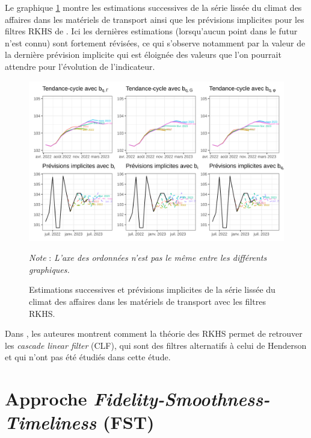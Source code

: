 \documentclass[
  12pt,
  a4paper,french]{article}
\newcommand\1{\mathds{1}}
\begin{document}
Le graphique \ref{fig:graphs-ex-rkhs} montre les estimations successives de la série lissée du climat des affaires dans les matériels de transport ainsi que les prévisions implicites pour les filtres RKHS de \textcite{dagumbianconcini2015new}.
Ici les dernières estimations (lorsqu'aucun point dans le futur n'est connu) sont fortement révisées, ce qui s'observe notamment par la valeur de la dernière prévision implicite qui est éloignée des valeurs que l'on pourrait attendre pour l'évolution de l'indicateur.

\begin{figure}

{\centering \includegraphics[width=1\linewidth]{img/ex/rkhs} 

}

\caption[Estimations successives et prévisions implicites de la série lissée du climat des affaires dans les matériels de transport avec les filtres RKHS]{Estimations successives et prévisions implicites de la série lissée du climat des affaires dans les matériels de transport avec les filtres RKHS.}\label{fig:graphs-ex-rkhs}

\footnotesize


\emph{Note} : \emph{L'axe des ordonnées n'est pas le même entre les différents graphiques.}
\normalsize\end{figure}

Dans \textcite{dagumBianconcini2023}, les auteures montrent comment la théorie des RKHS permet de retrouver les \emph{cascade linear filter} (CLF), qui sont des filtres alternatifs à celui de Henderson et qui n'ont pas été étudiés dans cette étude.

\hypertarget{subsec-GuggemosEtAl}{%
\section{\texorpdfstring{Approche \emph{Fidelity-Smoothness-Timeliness} (FST)}{Approche Fidelity-Smoothness-Timeliness (FST)}}\label{subsec-GuggemosEtAl}}
\end{document}
